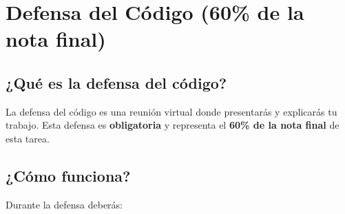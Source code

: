\documentclass[12pt,a4paper]{article}
\begin{document}
\section{Defensa del Código (60\% de la nota final)}

\subsection{¿Qué es la defensa del código?}

La defensa del código es una reunión virtual donde presentarás y explicarás tu trabajo. Esta defensa es \textbf{obligatoria} y representa el \textbf{60\% de la nota final} de esta tarea.

\subsection{¿Cómo funciona?}

Durante la defensa deberás:
\end{document}
